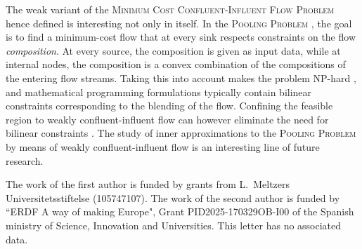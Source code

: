 \documentclass[pdflatex,sn-mathphys-num]{sn-jnl}%
\theoremstyle{thmstyleone}%
\begin{document}
The weak variant of the \textsc{Minimum Cost Confluent-Influent Flow Problem} hence defined is interesting not only in itself.
In the \textsc{Pooling Problem} \cite{haverly1978pooling}, the goal is to find a minimum-cost flow that at every sink respects constraints on the flow \emph{composition}.
At every source, the composition is given as input data, while at internal nodes, the composition is a convex combination of the compositions of the entering flow streams.
Taking this into account makes the problem NP-hard \cite{alfaki2013formulations}, and mathematical programming formulations typically contain bilinear constraints corresponding to the blending of the flow.
Confining the feasible region to weakly confluent-influent flow can however eliminate the need for bilinear constraints \cite{gestsson2026thesis}.
The study of inner approximations to the \textsc{Pooling Problem} by means of weakly confluent-influent flow is an interesting line of future research.

\backmatter
{}
\small{The work of the first author is funded by grants from L.\ Meltzers Universitetsstiftelse (105747107).}
\small{The work of the second author is funded by “ERDF A way of making Europe", Grant PID2025-170329OB-I00 of the Spanish ministry of Science, Innovation and Universities.}
\small{This letter has no associated data.}

% 

\end{document}
